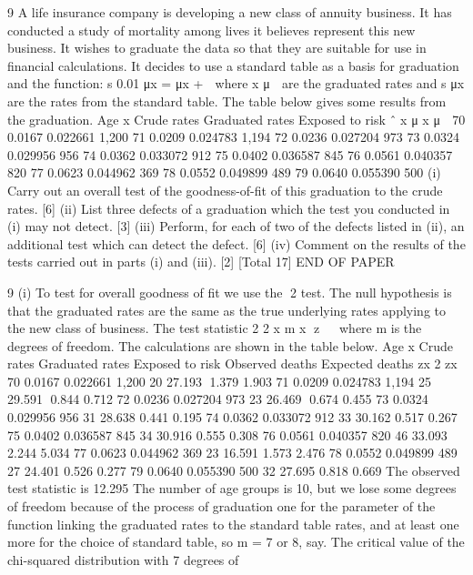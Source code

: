 \documentclass[a4paper,12pt]{article}
\begin{document}
9 A life insurance company is developing a new class of annuity business. It has
conducted a study of mortality among lives it believes represent this new business. It
wishes to graduate the data so that they are suitable for use in financial calculations.
It decides to use a standard table as a basis for graduation and the function:
s 0.01
μx = μx + 􀁄
where x μ
􀁄
are the graduated rates and s
μx are the rates from the standard table.
The table below gives some results from the graduation.
Age x Crude rates Graduated rates Exposed to risk
ˆ x μ x μ
􀁄
70 0.0167 0.022661 1,200
71 0.0209 0.024783 1,194
72 0.0236 0.027204 973
73 0.0324 0.029956 956
74 0.0362 0.033072 912
75 0.0402 0.036587 845
76 0.0561 0.040357 820
77 0.0623 0.044962 369
78 0.0552 0.049899 489
79 0.0640 0.055390 500
(i) Carry out an overall test of the goodness-of-fit of this graduation to the crude
rates. [6]
(ii) List three defects of a graduation which the test you conducted in (i) may not
detect. [3]
(iii) Perform, for each of two of the defects listed in (ii), an additional test which
can detect the defect. [6]
(iv) Comment on the results of the tests carried out in parts (i) and (iii). [2]
[Total 17]
END OF PAPER

9 (i) To test for overall goodness of fit we use the 2 test.
The null hypothesis is that the graduated rates are the same as the true
underlying rates applying to the new class of business.
The test statistic 2 2
x m
x
z   where m is the degrees of freedom.
The calculations are shown in the table below.
Age x Crude rates
Graduated
rates
Exposed
to risk
Observed
deaths
Expected
deaths zx 2
zx
70 0.0167 0.022661 1,200 20 27.193 1.379 1.903
71 0.0209 0.024783 1,194 25 29.591 0.844 0.712
72 0.0236 0.027204 973 23 26.469 0.674 0.455
73 0.0324 0.029956 956 31 28.638 0.441 0.195
74 0.0362 0.033072 912 33 30.162 0.517 0.267
75 0.0402 0.036587 845 34 30.916 0.555 0.308
76 0.0561 0.040357 820 46 33.093 2.244 5.034
77 0.0623 0.044962 369 23 16.591 1.573 2.476
78 0.0552 0.049899 489 27 24.401 0.526 0.277
79 0.0640 0.055390 500 32 27.695 0.818 0.669
The observed test statistic is 12.295
The number of age groups is 10, but we lose some degrees of freedom
because of the process of graduation
one for the parameter of the function linking the graduated rates to the
standard table rates, and at least one more for the choice of standard table, so
m = 7 or 8, say.
The critical value of the chi-squared distribution with 7 degrees of
\end{document}
